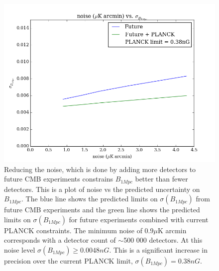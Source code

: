 \begin{figure}[h]
\centering
\includegraphics[scale=0.7]{images/noise.png}
\caption{Reducing the noise, which is done by adding more detectors to future CMB experiments constrains $B_{1Mpc}$ better than fewer detectors. This is a plot of noise vs the predicted uncertainty on $B_{1Mpc}$. The blue line shows the predicted limits on $\sigma(B_{1Mpc})$ from future CMB experiments and the green line shows the predicted limits on $\sigma(B_{1Mpc})$ for future experiments combined with current PLANCK constraints. The minimum noise of 0.9$\mu$K arcmin corresponds with a detector count of $\sim$500 000 detectors. At this noise level $\sigma(B_{1Mpc}) \geq 0.0048nG$. This is a significant increase in precision over the current PLANCK limit, $\sigma(B_{1Mpc}) = 0.38nG$.}
\label{fig:noise}
\end{figure}

